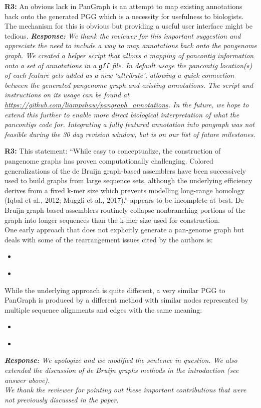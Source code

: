 \documentclass[aps,rmp,onecolumn]{revtex4-1}
\newcommand{\reviewer}[2]{\textbf{#1:} #2\vskip 5mm}
\newcommand{\response}[1]{{\it {\color{response}\textbf{Response:} #1}}\vskip 5mm}
\begin{document}
\reviewer{R3}{An obvious lack in PanGraph is an attempt to map existing annotations back onto the generated PGG which is a necessity for usefulness to biologists. The mechanism for this is obvious but providing a useful user interface might be tedious.}
\response{We thank the reviewer for this important suggestion and appreciate the need to include a way to map annotations back onto the pangenome graph. 
We created a helper script that allows a mapping of pancontig information onto a set of annotations in a \texttt{gff} file. 
In default usage the pancontig location(s) of each feature gets added as a new `attribute', allowing a quick connection between the generated pangenome graph and existing annotations. 
The script and instructions on its usage can be found at \url{https://github.com/liampshaw/pangraph\_annotations}. 
In the future, we hope to extend this further to enable more direct biological interpretation of what the pancontigs code for. 
Integrating a fully featured annotation into pangraph was not feasible during the 30 day revision window, but is on our list of future milestones. 
}

\reviewer{R3}{
      This statement: ``While easy to conceptualize, the construction of pangenome graphs has proven computationally challenging. Colored generalizations of the de Bruijn graph-based assemblers have been successively used to build graphs from large sequence sets, although the underlying efficiency derives from a fixed k-mer size which prevents modelling long-range homology (Iqbal et al., 2012; Muggli et al., 2017).'' appears to be incomplete at best. De Bruijn graph-based assemblers routinely collapse nonbranching portions of the graph into longer sequences than the k-mer size used for construction.\\
      One early approach that does not explicitly generate a pan-genome graph but deals with some of the rearrangement issues cited by the authors is:
      \begin{itemize}
            \item \cite{angiuoli2011improving}
            \item \cite{angiuoli2011mugsy}
      \end{itemize}
      While the underlying approach is quite different, a very similar PGG to PanGraph is produced by a different method with similar nodes represented by multiple sequence alignments and edges with the same meaning:
      \begin{itemize}
            \item \cite{sutton2021pan}
            \item \cite{chan2015novel}
      \end{itemize}}
\response{
We apologize and we modified the sentence in question. We also extended the discussion of de Bruijn graphs methods in the introduction (see answer above).\\
We thank the reviewer for pointing out these important contributions that were not previously discussed in the paper.
}
\end{document}
